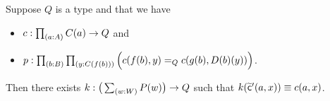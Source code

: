 \documentclass[hott-all.tex]{subfiles}
\begin{document}
% 
% 
% 
\begin{lem}
  Suppose $Q$ is a type and that we have
  \begin{itemize}
  \item $c : \prd{a:A} C(a) \to Q$ and
  \item $p : \prd{b:B}{y:C(f(b))} \Big(c(f(b),y) =_Q c(g(b),D(b)(y))\Big)$.
  \end{itemize}
  Then there exists $k:\big(\sm{w:W} P(w)\big) \to Q$ such that $k(\widetilde{\mathsf{c}}'(a,x)) \equiv c(a,x)$.
\end{lem}
\end{document}
